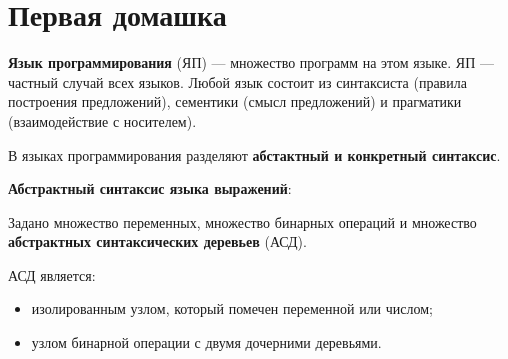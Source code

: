 


\usepackage{fancyvrb}
\usepackage{fvextra}

\usepackage[scr=rsfs]{mathalpha}

\newcommand{\Lang}{\mathscr{L}}
\newcommand{\Lother}{\mathscr{M}} %
\newcommand{\Lexpr}{\mathscr{E}}  %
\newcommand{\Lstat}{\mathscr{S}}  %
\newcommand{\Linst}{\mathscr{I}}  %
\newcommand{\Lprog}{\mathscr{P}}  %

\newcommand{\Conf}{\mathscr{C}} %
\newcommand{\Word}{\mathscr{W}} %
\newcommand{\Var}{\mathscr{X}}  %

\newcommand{\neatarrow}{\DOTSB\Rightarrow}

\newcommand{\semant}[1]{\llbracket #1 \rrbracket} 



\section{Первая домашка}

\textbf{Язык программирования} (ЯП) --- множество программ на этом языке. ЯП
--- частный случай всех языков. Любой язык состоит из синтаксиста (правила
построения предложений), сементики (смысл предложений) и прагматики
(взаимодействие с носителем).

В языках программирования разделяют \textbf{абстактный и конкретный синтаксис}.

\textbf{Абстрактный синтаксис языка выражений}:


Задано множество переменных, множество бинарных операций и множество
\textbf{абстрактных синтаксических деревьев} (АСД).

АСД является:

\begin{itemize}
    \item изолированным узлом, который помечен переменной или числом;

    \item узлом бинарной операции с двумя дочерними деревьями.
\end{itemize}

